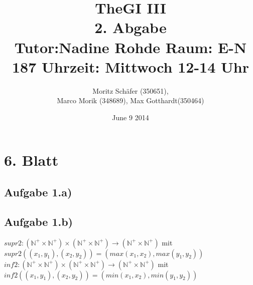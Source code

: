 \documentclass[10pt,a4paper,german,landscape,fleqn]{article} \usepackage[utf8]{inputenc} %
\begin{document}
\title{TheGI III \\
2. Abgabe\\
Tutor:Nadine Rohde Raum: E-N 187 Uhrzeit: Mittwoch 12-14 Uhr \\ } %
\author{Moritz Schäfer (350651), \\
Marco Morik (348689), Max Gotthardt(350464)} %
\date{June 9 2014} %

\maketitle



\newpage

\section*{6. Blatt } %
\subsection*{Aufgabe 1.a)}



\subsection*{Aufgabe 1.b)}

$ supr2 : (\mathbb N^{+} \times \mathbb N^{+} ) \times (\mathbb N^{+} \times \mathbb N^{+} ) \rightarrow (\mathbb N^{+} \times \mathbb N^{+} )$ mit \\
$ supr2((x_1,y_1),(x_2,y_2)) = (max(x_1, x_2), max(y_1, y_2)) $
$ inf2 : (\mathbb N^{+} \times \mathbb N^{+} ) \times (\mathbb N^{+} \times \mathbb N^{+} ) \rightarrow (\mathbb N^{+} \times \mathbb N^{+} )$ mit \\
$ inf2((x_1,y_1),(x_2,y_2)) = (min(x_1, x_2), min(y_1, y_2)) $
\end{document}
